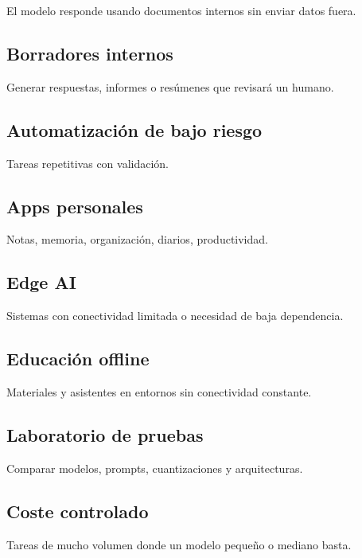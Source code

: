 El modelo responde usando documentos internos sin enviar datos fuera.

\subsection{Borradores internos}\label{borradores-internos}

Generar respuestas, informes o resúmenes que revisará un humano.

\subsection{Automatización de bajo
riesgo}\label{automatizaciuxf3n-de-bajo-riesgo}

Tareas repetitivas con validación.

\subsection{Apps personales}\label{apps-personales}

Notas, memoria, organización, diarios, productividad.

\subsection{Edge AI}\label{edge-ai}

Sistemas con conectividad limitada o necesidad de baja dependencia.

\subsection{Educación offline}\label{educaciuxf3n-offline}

Materiales y asistentes en entornos sin conectividad constante.

\subsection{Laboratorio de pruebas}\label{laboratorio-de-pruebas}

Comparar modelos, prompts, cuantizaciones y arquitecturas.

\subsection{Coste controlado}\label{coste-controlado}

Tareas de mucho volumen donde un modelo pequeño o mediano basta.

